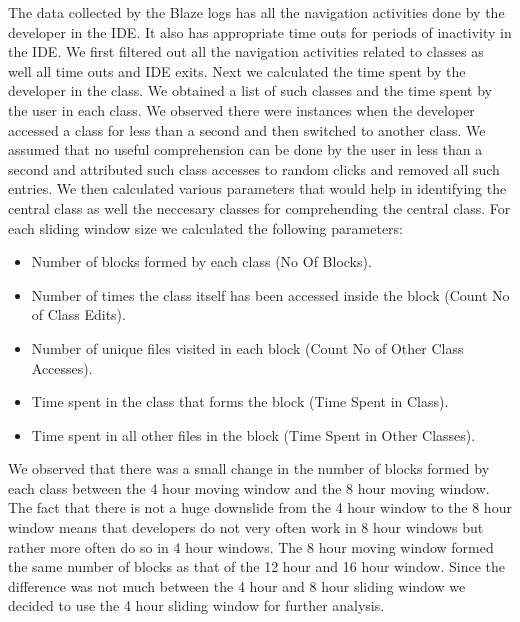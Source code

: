 The data collected by the Blaze logs has all the navigation activities done by the developer in the IDE. It also has appropriate time outs for periods of inactivity in the IDE. We first filtered out all the navigation activities related to classes as well all time outs and IDE exits. Next we calculated the time spent by the developer in the class. We obtained a list of such classes and the time spent by the user in each class. We observed there were instances when the developer accessed a class for less than a second and then switched to another class. We assumed that no useful comprehension can be done by the user in less than a second and attributed such class accesses to random clicks and removed all such entries. We then calculated various parameters that would help in identifying the central class as well the neccesary classes for comprehending the central class. For each sliding window size we calculated the following parameters:
\begin{itemize}
	\item[] Number of blocks formed by each class (No Of Blocks).
	\item[] Number of times the class itself has been accessed inside the block (Count No of Class Edits).
	\item[] Number of unique files visited in each block (Count No of Other Class Accesses).
	\item[] Time spent in the class that forms the block (Time Spent in Class).
	\item[] Time spent in all other files in the block (Time Spent in Other Classes). 
\end{itemize}
We observed that there was a small change in the number of blocks formed by each class between the 4 hour moving window and the 8 hour moving window. The fact that there is not a huge downslide from the 4 hour window to the 8 hour window means that developers do not very often work in 8 hour windows but rather more often do so in 4 hour windows. The 8 hour moving window formed the same number of blocks as that of the 12 hour and 16 hour window. Since the difference was not much between the 4 hour and 8 hour sliding window we decided to use the 4 hour sliding window for further analysis.

